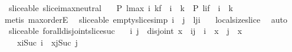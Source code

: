 \begin{isabellebody}
\isamarkupfalse%
\ {\isacharparenleft}\ sliceable{\isacharparenright}\ slice{\isacharunderscore}i{\isacharunderscore}max{\isacharunderscore}neutral{\isacharcolon}\ \isanewline
\ \ {\isachardoublequoteopen}{\isacharparenleft}P\ {\isacharparenleft}l{\isasymdagger}{\isacharparenleft}max\ i\ k{\isacharparenright}{\isachardot}{\isachardot}f{\isacharparenright}\ {\isasymand}\ i\ {\isasymge}\ k{\isacharparenright}\ {\isasymlongleftrightarrow}\ {\isacharparenleft}P\ {\isacharparenleft}l{\isasymdagger}i{\isachardot}{\isachardot}f{\isacharparenright}\ {\isasymand}\ i\ {\isasymge}\ k{\isacharparenright}{\isachardoublequoteclose}\isanewline
%
\isadelimproof
%
\endisadelimproof
%
\isatagproof
{}\isamarkupfalse%
\ {\isacharparenleft}metis\ max{\isachardot}orderE{\isacharparenright}%
\endisatagproof
{\isafoldproof}%
%
\isadelimproof
\isanewline
%
\endisadelimproof
\isanewline
{}\isamarkupfalse%
\ {\isacharparenleft}\ sliceable{\isacharparenright}\ empty{\isacharunderscore}slice{\isacharbrackleft}simp{\isacharbrackright}{\isacharcolon}\ {\isachardoublequoteopen}i\ {\isasymle}\ j\ {\isasymLongrightarrow}\ {\isacharparenleft}{\isacharhash}{\isacharparenleft}l{\isasymdagger}j{\isachardot}{\isachardot}i{\isacharparenright}{\isacharparenright}\ {\isacharequal}\ {}{\isachardoublequoteclose}\isanewline
%
\isadelimproof
%
\endisadelimproof
%
\isatagproof
{}\isamarkupfalse%
\ local{\isachardot}size{\isacharunderscore}slice\ \isamarkupfalse%
\ auto%
\endisatagproof
{\isafoldproof}%
%
\isadelimproof
\isanewline
%
\endisadelimproof
\isanewline
{}\isamarkupfalse%
\ {\isacharparenleft}\ sliceable{\isacharparenright}\ forall{\isacharunderscore}disjoint{\isacharunderscore}slice{\isacharunderscore}suc{\isacharcolon}\isanewline
\ \ {\isachardoublequoteopen}{\isasymforall}\ i\ j\ {\isachardot}\ {\isacharparenleft}disjoint\ x\ {\isasymand}\ i{\isasymnoteq}j\ {\isasymand}\ i\ {\isacharless}\ {\isacharparenleft}{\isacharhash}x{\isacharparenright}\ {\isasymand}\ j\ {\isacharless}\ {\isacharparenleft}{\isacharhash}x{\isacharparenright}{\isacharparenright}\ {\isasymlongrightarrow}\ \isanewline
\ \ \ \ {\isacharparenleft}x{\isasymdagger}i{\isachardot}{\isachardot}{\isacharparenleft}Suc\ i{\isacharparenright}\ {\isasymnoteq}\ x{\isasymdagger}j{\isachardot}{\isachardot}{\isacharparenleft}Suc\ j{\isacharparenright}{\isacharparenright}{\isachardoublequoteclose}\isanewline
%
\isadelimproof
%
\endisadelimproof
%
\isatagproof
{}\isamarkupfalse%

\end{isabellebody}
